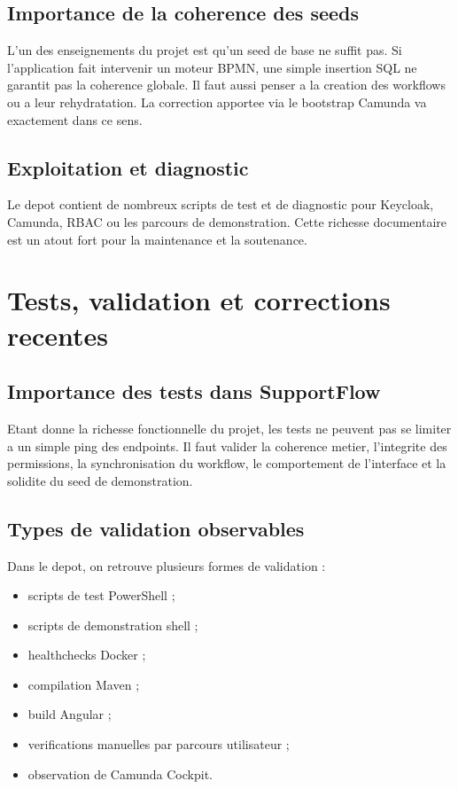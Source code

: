 \documentclass[12pt,a4paper,oneside]{report}
\begin{document}
\section{Importance de la coherence des seeds}

L'un des enseignements du projet est qu'un seed de base ne suffit pas. Si l'application fait intervenir un moteur BPMN, une simple insertion SQL ne garantit pas la coherence globale. Il faut aussi penser a la creation des workflows ou a leur rehydratation. La correction apportee via le bootstrap Camunda va exactement dans ce sens.

\section{Exploitation et diagnostic}

Le depot contient de nombreux scripts de test et de diagnostic pour Keycloak, Camunda, RBAC ou les parcours de demonstration. Cette richesse documentaire est un atout fort pour la maintenance et la soutenance.

\chapter{Tests, validation et corrections recentes}

\section{Importance des tests dans SupportFlow}

Etant donne la richesse fonctionnelle du projet, les tests ne peuvent pas se limiter a un simple ping des endpoints. Il faut valider la coherence metier, l'integrite des permissions, la synchronisation du workflow, le comportement de l'interface et la solidite du seed de demonstration.

\section{Types de validation observables}

Dans le depot, on retrouve plusieurs formes de validation :

\begin{itemize}[leftmargin=1.2cm]
  \item scripts de test PowerShell ;
  \item scripts de demonstration shell ;
  \item healthchecks Docker ;
  \item compilation Maven ;
  \item build Angular ;
  \item verifications manuelles par parcours utilisateur ;
  \item observation de Camunda Cockpit.
\end{itemize}
\end{document}
